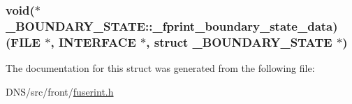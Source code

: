 \subsubsection[{\texorpdfstring{\+\_\+fprint\+\_\+boundary\+\_\+state\+\_\+data}{_fprint_boundary_state_data}}]{\setlength{\rightskip}{0pt plus 5cm}void($\ast$ \+\_\+\+B\+O\+U\+N\+D\+A\+R\+Y\+\_\+\+S\+T\+A\+T\+E\+::\+\_\+fprint\+\_\+boundary\+\_\+state\+\_\+data) (F\+I\+LE $\ast$, {\bf I\+N\+T\+E\+R\+F\+A\+CE} $\ast$, struct {\bf \+\_\+\+B\+O\+U\+N\+D\+A\+R\+Y\+\_\+\+S\+T\+A\+TE} $\ast$)}\hypertarget{struct___b_o_u_n_d_a_r_y___s_t_a_t_e_af1b6dda43f3b86c42242f03a5e579290}{}\label{struct___b_o_u_n_d_a_r_y___s_t_a_t_e_af1b6dda43f3b86c42242f03a5e579290}


The documentation for this struct was generated from the following file\+:\begin{DoxyCompactItemize}
\item 
D\+N\+S/src/front/\hyperlink{fuserint_8h}{fuserint.\+h}\end{DoxyCompactItemize}
